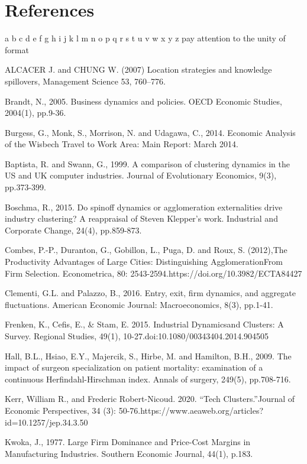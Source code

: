 \documentclass[
  12pt,
  oneside]{book}
\begin{document}
\hypertarget{references}{%
\chapter*{References}\label{references}}

a b c d e f g h i j k l m n o p q r s t u v w x y z
pay attention to the unity of format

ALCACER J. and CHUNG W. (2007) Location strategies and knowledge spillovers, Management Science 53, 760--776.

Brandt, N., 2005. Business dynamics and policies. OECD Economic Studies, 2004(1), pp.9-36.

Burgess, G., Monk, S., Morrison, N. and Udagawa, C., 2014. Economic Analysis of the Wisbech Travel to Work Area: Main Report: March 2014.

Baptista, R. and Swann, G., 1999. A comparison of clustering dynamics in the US and UK computer industries. Journal of Evolutionary Economics, 9(3), pp.373-399.

Boschma, R., 2015. Do spinoff dynamics or agglomeration externalities drive industry clustering? A reappraisal of Steven Klepper's work. Industrial and Corporate Change, 24(4), pp.859-873.

Combes, P.-P., Duranton, G., Gobillon, L., Puga, D. and Roux, S. (2012),The Productivity Advantages of Large Cities: Distinguishing AgglomerationFrom Firm Selection. Econometrica, 80: 2543-2594.https://doi.org/10.3982/ECTA84427

Clementi, G.L. and Palazzo, B., 2016. Entry, exit, firm dynamics, and aggregate fluctuations. American Economic Journal: Macroeconomics, 8(3), pp.1-41.

Frenken, K., Cefis, E., \& Stam, E. 2015. Industrial Dynamicsand Clusters: A Survey. Regional Studies, 49(1), 10-27.doi:10.1080/00343404.2014.904505

Hall, B.L., Hsiao, E.Y., Majercik, S., Hirbe, M. and Hamilton, B.H., 2009. The impact of surgeon specialization on patient mortality: examination of a continuous Herfindahl-Hirschman index. Annals of surgery, 249(5), pp.708-716.

Kerr, William R., and Frederic Robert-Nicoud. 2020. ``Tech Clusters.''Journal of Economic Perspectives, 34 (3): 50-76.https://www.aeaweb.org/articles?id=10.1257/jep.34.3.50

Kwoka, J., 1977. Large Firm Dominance and Price-Cost Margins in Manufacturing Industries. Southern Economic Journal, 44(1), p.183.
\end{document}
